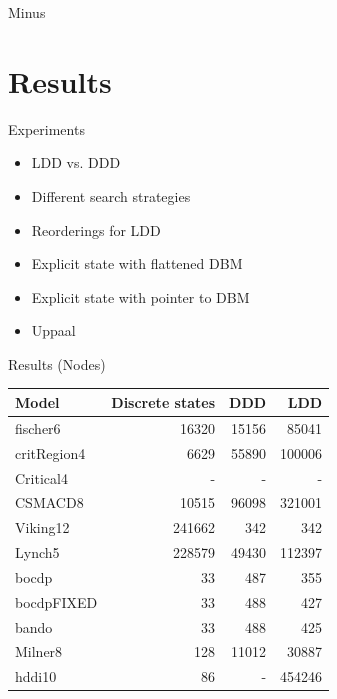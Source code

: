 \begin{frame}{Minus}
\begin{figure}
\begin{subfigure}{0.3\textwidth}
{\begin{tikzpicture}[
		smallvertex/.style={rectangle,rounded corners=3pt,draw,scale=0.8}
		]
	
	\end{tikzpicture}}
	\end{subfigure}
\end{figure}
\end{frame}



\section{Results}

\begin{frame}{Experiments}
\begin{itemize}
	\item LDD vs. DDD
	\item Different search strategies
	\item Reorderings for LDD
	\item Explicit state with flattened DBM
	\item Explicit state with pointer to DBM
	\item Uppaal
\end{itemize}
\end{frame}

\begin{frame}{Results (Nodes)}

\begin{table}
    \begin{tabular}{|l|r|r|r|}
    \hline
     Model      & Discrete states & DDD     & LDD         \\ \hline
    fischer6    & 16320           & 15156   & 85041       \\
    critRegion4 & 6629            & 55890   & 100006      \\
    Critical4   & -               & -       & -           \\
    CSMACD8     & 10515           & 96098   & 321001      \\
    Viking12    & 241662          & 342     & 342         \\
    Lynch5      & 228579          & 49430   & 112397      \\
    bocdp       & 33              & 487     & 355         \\
    bocdpFIXED  & 33              & 488     & 427         \\
    bando       & 33              & 488     & 425         \\
    Milner8     & 128             & 11012   & 30887       \\
    hddi10      & 86              & -       & 454246      \\ \hline
    \end{tabular}
\end{table}

\end{frame}

